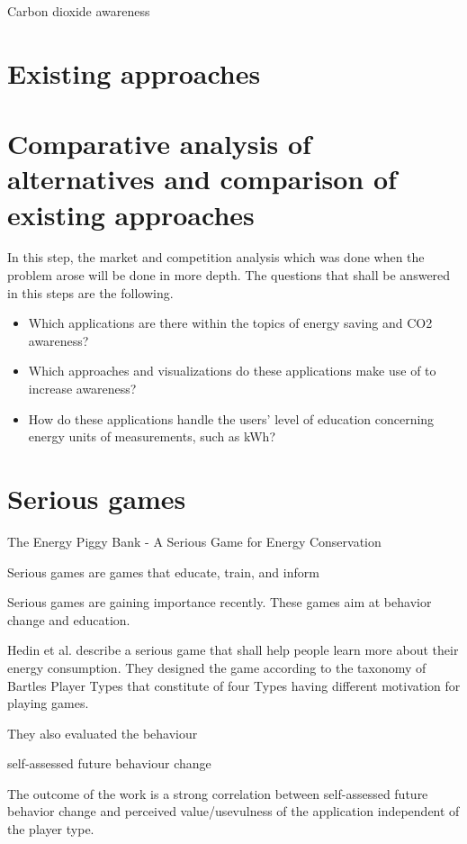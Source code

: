 Carbon dioxide awareness

\cite{mohammadmoradieffectiveness}

\section{Existing approaches}

\section{Comparative analysis of alternatives and comparison of existing approaches}
In this step, the market and competition analysis which was done when the problem arose will be done in more depth. The questions that shall be answered in this steps are the following.
\begin{itemize}
	\item Which applications are there within the topics of energy saving and CO2 awareness?
	\item Which approaches and visualizations do these applications make use of to increase awareness?
	\item How do these applications handle the users' level of education concerning energy units of measurements, such as kWh?
\end{itemize}

\section{Serious games}

The Energy Piggy Bank - A Serious Game for Energy Conservation

Serious games are games that educate, train, and inform

Serious games are gaining importance recently. These games aim at behavior change and education.

Hedin et al. \cite{Bjorn1165339} describe a serious game that shall help people learn more about their energy consumption. They designed the game according to the taxonomy of Bartles Player Types that constitute of four Types having different motivation for playing games.


They also evaluated the behaviour 

self-assessed future behaviour change 

The outcome of the work is a strong correlation between self-assessed future behavior change and perceived value/usevulness of the application independent of the player type.

